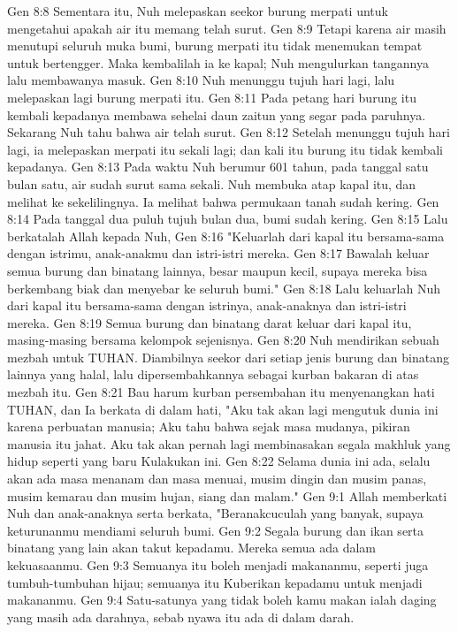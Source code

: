 Gen 8:8  Sementara itu, Nuh melepaskan seekor burung merpati untuk mengetahui apakah air itu memang telah surut.
Gen 8:9  Tetapi karena air masih menutupi seluruh muka bumi, burung merpati itu tidak menemukan tempat untuk bertengger. Maka kembalilah ia ke kapal; Nuh mengulurkan tangannya lalu membawanya masuk.
Gen 8:10  Nuh menunggu tujuh hari lagi, lalu melepaskan lagi burung merpati itu.
Gen 8:11  Pada petang hari burung itu kembali kepadanya membawa sehelai daun zaitun yang segar pada paruhnya. Sekarang Nuh tahu bahwa air telah surut.
Gen 8:12  Setelah menunggu tujuh hari lagi, ia melepaskan merpati itu sekali lagi; dan kali itu burung itu tidak kembali kepadanya.
Gen 8:13  Pada waktu Nuh berumur 601 tahun, pada tanggal satu bulan satu, air sudah surut sama sekali. Nuh membuka atap kapal itu, dan melihat ke sekelilingnya. Ia melihat bahwa permukaan tanah sudah kering.
Gen 8:14  Pada tanggal dua puluh tujuh bulan dua, bumi sudah kering.
Gen 8:15  Lalu berkatalah Allah kepada Nuh,
Gen 8:16  "Keluarlah dari kapal itu bersama-sama dengan istrimu, anak-anakmu dan istri-istri mereka.
Gen 8:17  Bawalah keluar semua burung dan binatang lainnya, besar maupun kecil, supaya mereka bisa berkembang biak dan menyebar ke seluruh bumi."
Gen 8:18  Lalu keluarlah Nuh dari kapal itu bersama-sama dengan istrinya, anak-anaknya dan istri-istri mereka.
Gen 8:19  Semua burung dan binatang darat keluar dari kapal itu, masing-masing bersama kelompok sejenisnya.
Gen 8:20  Nuh mendirikan sebuah mezbah untuk TUHAN. Diambilnya seekor dari setiap jenis burung dan binatang lainnya yang halal, lalu dipersembahkannya sebagai kurban bakaran di atas mezbah itu.
Gen 8:21  Bau harum kurban persembahan itu menyenangkan hati TUHAN, dan Ia berkata di dalam hati, "Aku tak akan lagi mengutuk dunia ini karena perbuatan manusia; Aku tahu bahwa sejak masa mudanya, pikiran manusia itu jahat. Aku tak akan pernah lagi membinasakan segala makhluk yang hidup seperti yang baru Kulakukan ini.
Gen 8:22  Selama dunia ini ada, selalu akan ada masa menanam dan masa menuai, musim dingin dan musim panas, musim kemarau dan musim hujan, siang dan malam."
Gen 9:1  Allah memberkati Nuh dan anak-anaknya serta berkata, "Beranakcuculah yang banyak, supaya keturunanmu mendiami seluruh bumi.
Gen 9:2  Segala burung dan ikan serta binatang yang lain akan takut kepadamu. Mereka semua ada dalam kekuasaanmu.
Gen 9:3  Semuanya itu boleh menjadi makananmu, seperti juga tumbuh-tumbuhan hijau; semuanya itu Kuberikan kepadamu untuk menjadi makananmu.
Gen 9:4  Satu-satunya yang tidak boleh kamu makan ialah daging yang masih ada darahnya, sebab nyawa itu ada di dalam darah.
